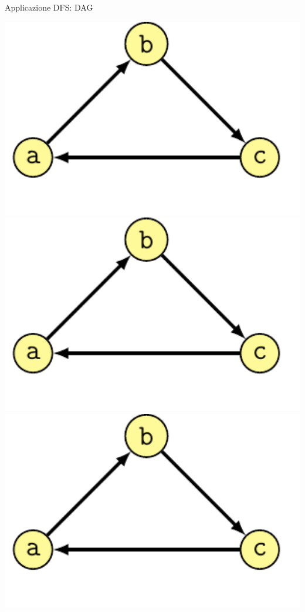 \begin{frame}{Applicazione DFS: DAG}

\begin{center}
\begin{overprint}[0.5\textwidth]
\includegraphics[width=1.0\textwidth,page=1]{acyclic-schema-ciclo.pdf}
\includegraphics[width=1.0\textwidth,page=2]{acyclic-schema-ciclo.pdf}
\includegraphics[width=1.0\textwidth,page=3]{acyclic-schema-ciclo.pdf}

\end{overprint}
\end{center}
\end{frame}
